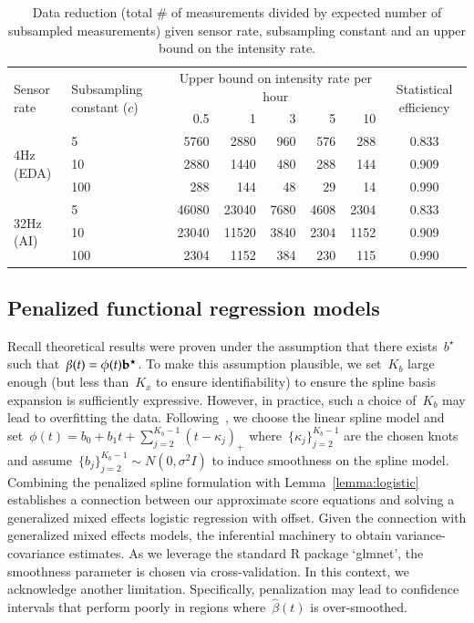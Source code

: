 \documentclass[12pt]{amsart}
\begin{document}
\begin{table}[!th]
\centering
\begin{tabular}{l l r r r r r | c}
\multirow{2}{2.5cm}{Sensor rate} &
\multirow{2}{2.5cm}{Subsampling constant ($c$)}
  & \multicolumn{5}{c}{Upper bound on intensity rate per
    hour}
  & \multirow{2}{2cm}{Statistical efficiency}\\ \cline{3-7}
& & 0.5 & 1 & 3 & 5 & 10 \\ \hline
\multirow{3}{*}{4Hz (EDA)}
& 5 & 5760 & 2880 & 960 & 576 & 288 & 0.833 \\
& 10 & 2880 & 1440 & 480 & 288 & 144 & 0.909 \\
& 100 & 288 & 144 & 48 & 29 & 14 & 0.990 \\ \hline
\multirow{3}{*}{32Hz (AI)}
& 5 & 46080 & 23040 & 7680 & 4608 & 2304 & 0.833 \\
& 10 & 23040 & 11520 & 3840 & 2304 & 1152 & 0.909 \\
& 100 & 2304 & 1152 & 384 & 230 & 115 & 0.990 \\ \hline
\end{tabular}
\caption{Data reduction (total \# of measurements divided by expected number of subsampled measurements) given sensor rate, subsampling constant and an upper bound on the intensity rate.}
\label{tab:compvseff}
\end{table}

\subsection{Penalized functional regression models}

Recall theoretical results were proven under the assumption that there exists~$b^\star$ such that~$\beta(t) = \phi(t) {\bf b}^\star$. To make this assumption plausible, we set~$K_b$ large enough (but less than~$K_x$ to ensure identifiability) to ensure the spline basis expansion is sufficiently expressive. However, in practice, such a choice of~$K_b$ may lead to overfitting the data. Following~\cite{Goldsmith2011}, we choose the linear spline model and set~$\phi(t) = b_0 + b_1 t + \sum_{j=2}^{K_b-1} (t-\kappa_j)_{+}$ where~$\{ \kappa_j \}_{j=2}^{K_b-1}$ are the chosen knots and assume~$\{ b_j \}_{j=2}^{K_b-1} \sim N(0, \sigma^2 I)$ to induce smoothness on the spline model.  Combining the penalized spline formulation with Lemma~\ref{lemma:logistic} establishes a connection between our approximate score equations and solving a generalized mixed effects logistic regression with offset.  Given the connection with generalized mixed effects models, the inferential machinery to obtain variance-covariance estimates.  As we leverage the standard R package `glmnet', the smoothness parameter is chosen via cross-validation. In this context, we acknowledge another limitation.  Specifically, penalization may lead to confidence intervals that perform poorly in regions where~$\hat \beta(t)$ is over-smoothed.
\end{document}
